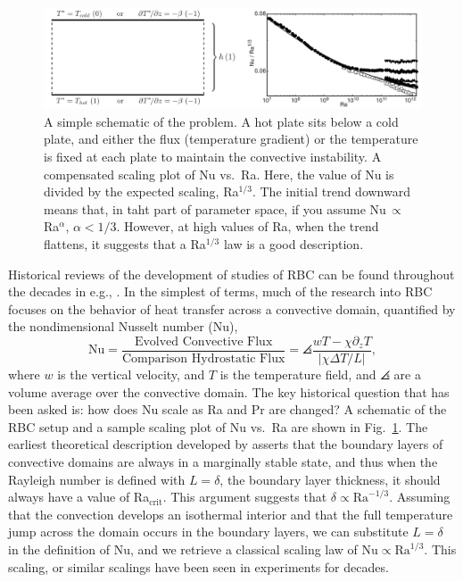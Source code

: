 \begin{figure}[t!]
\includegraphics[width=\textwidth]{./figs/intro/rayleigh_benard_description.pdf}
\caption[A description of \RB convection studies.]
{
	\citep[left, Fig.~1 of][]{johnston&doering2009} A simple schematic of the \RB problem.
	A hot plate sits below a cold plate, and either the flux (temperature gradient) or the temperature is fixed at each plate to maintain the convective instability.
	\citep[right, Fig.~4 of][]{ahlers&all2009} A compensated scaling plot of Nu vs.~Ra.
	Here, the value of Nu is divided by the expected scaling, Ra$^{1/3}$.
	The initial trend downward means that, in taht part of parameter space, if you assume Nu$\,\propto\,$Ra$^{\alpha}$, $\alpha < 1/3$.
	However, at high values of Ra, when the trend flattens, it suggests that a Ra$^{1/3}$ law is a good description.
	\label{fig:rayleigh_benard_description} 
}
\end{figure}

Historical reviews of the development of studies of RBC can be found throughout the decades in e.g., \citet{busse1978, siggia1994, ahlers&all2009}.
In the simplest of terms, much of the research into RBC focuses on the behavior of heat transfer across a convective domain, quantified by the nondimensional Nusselt number (Nu),
\begin{equation}
\text{Nu} = \frac{\text{Evolved Convective Flux}}{\text{Comparison Hydrostatic Flux}} = \angles{\frac{w T - \chi \partial_z T}{|\chi \Delta T / L|}},
\end{equation}
where $w$ is the vertical velocity, and $T$ is the temperature field, and $\angles{}$ are a volume average over the convective domain.
The key historical question that has been asked is: how does Nu scale as Ra and Pr are changed?
A schematic of the RBC setup and a sample scaling plot of Nu vs.~Ra are shown in Fig.~\ref{fig:rayleigh_benard_description}.
The earliest theoretical description developed by \citet{malkus1954} asserts that the boundary layers of convective domains are always in a marginally stable state, and thus when the Rayleigh number is defined with $L = \delta$, the boundary layer thickness, it should always have a value of Ra$_{\text{crit}}$.
This argument suggests that $\delta \propto \text{Ra}^{-1/3}$.
Assuming that the convection develops an isothermal interior and that the full temperature jump across the domain occurs in the boundary layers, we can substitute $L = \delta$ in the definition of Nu, and we retrieve a classical scaling law of $\text{Nu} \propto \text{Ra}^{1/3}$.
This scaling, or similar scalings have been seen in experiments for decades.



